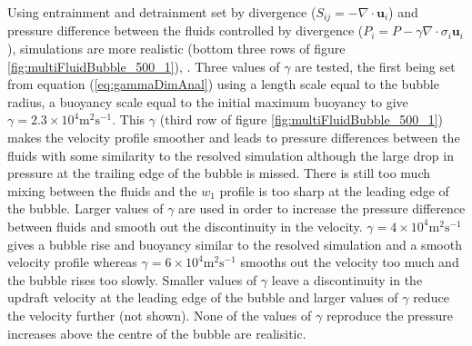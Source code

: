 \documentclass[draft]{agujournal2019}
\begin{document}
Using entrainment and detrainment set by divergence ($S_{ij}=-\nabla\cdot\mathbf{u}_{i}$)
and pressure difference between the fluids controlled by divergence
($P_{i}=P-\gamma\nabla\cdot\sigma_i\mathbf{u}_{i}$),  simulations are more realistic (bottom three rows of figure \ref{fig:multiFluidBubble_500_1}),
.
Three values of $\gamma$ are tested, the first being set from equation
(\ref{eq:gammaDimAnal}) using a length scale equal to the bubble
radius, a buoyancy scale equal to the initial maximum  buoyancy 
to give $\gamma=2.3\times10^{4}\text{m}^{2}\text{s}^{-1}$. This $\gamma$
(third row of figure \ref{fig:multiFluidBubble_500_1}) makes
the velocity profile
{smoother and leads to pressure differences between the fluids with some similarity to the resolved simulation although the large drop in pressure at the trailing edge of the bubble is missed. There is still too much mixing between the fluids and the $w_1$ profile is too sharp at the leading edge of the bubble.}
{Larger values of $\gamma$ are used in order to increase the pressure difference between fluids and smooth out the discontinuity in the velocity. $\gamma=4\times 10^4\text{m}^{2}\text{s}^{-1}$ gives a bubble rise and buoyancy similar to the resolved simulation and a smooth velocity profile whereas $\gamma=6\times 10^4\text{m}^{2}\text{s}^{-1}$ smooths out the velocity too much and the bubble rises too slowly.}
Smaller values of $\gamma$ leave a discontinuity in the updraft velocity at the leading edge of the bubble and larger values of $\gamma$ reduce the velocity further  (not shown). None of the values of $\gamma$ reproduce the 
pressure increases above the centre of the bubble are realisitic.
\end{document}

